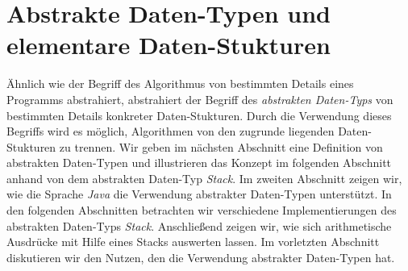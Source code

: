 \chapter{Abstrakte Daten-Typen und elementare Daten-Stukturen}
\"Ahnlich wie der Begriff des Algorithmus von bestimmten Details eines Programms
abstrahiert, abstrahiert der Begriff des \emph{abstrakten Daten-Typs} von bestimmten
Details konkreter Daten-Stukturen.  Durch die Verwendung dieses Begriffs wird es
m\"oglich, Algorithmen von den zugrunde liegenden Daten-Stukturen zu trennen.
Wir geben im n\"achsten Abschnitt eine Definition von abstrakten Daten-Typen und
illustrieren das Konzept im folgenden Abschnitt anhand von dem abstrakten Daten-Typ \textsl{Stack}.
Im zweiten Abschnitt zeigen wir, wie die Sprache \textsl{Java} die
Verwendung abstrakter Daten-Typen unterst\"utzt.  In den folgenden Abschnitten betrachten
wir verschiedene Implementierungen des abstrakten Daten-Typs \textsl{Stack}.
Anschlie{\ss}end zeigen wir, wie sich arithmetische Ausdr\"ucke mit Hilfe eines Stacks
auswerten lassen.
Im vorletzten Abschnitt diskutieren wir den Nutzen, den die Verwendung abstrakter
Daten-Typen hat. 

